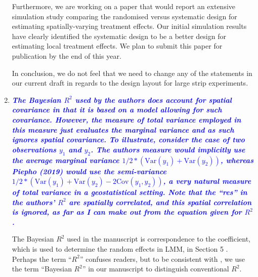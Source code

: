 \documentclass[a4paper]{article}   	%
\newcommand{\Var}{\mathrm{Var}}
\newcommand{\Cov}{\mathrm{Cov}}
\newcommand{\qtitle}[1]{\textit{\textbf{#1}}}
\begin{document}
\begin{enumerate}
    Furthermore, we are working on a paper that would report an extensive simulation study comparing the randomised versus systematic design for estimating spatially-varying treatment effects. Our initial simulation results have clearly identified the systematic design to be a better design for estimating local treatment effects. We plan to submit this paper for publication by the end of this year.
    
    In conclusion, we do not feel that we need to change any of the statements in our current draft in regards to the design layout for large strip experiments.
    
    
    
    \item \qtitle{\textcolor{blue}{The Bayesian $R^2$ used by the authors does account for spatial covariance in that it is based on a model allowing for such covariance. However, the measure of total variance employed in this measure just evaluates the marginal variance and as such ignores spatial covariance. To illustrate, consider the case of two observations $y_1$ and $y_2$. The authors measure would implicitly use the average marginal variance $1/2 * (\Var(y_1) + \Var(y_2))$, whereas Piepho (2019) would use the semi-variance $1/2 * (\Var(y_1) + \Var(y_2) - 2 \Cov(y_1, y_2))$, a very natural measure of total variance in a geostatistical setting. Note that the ``res'' in the authors' $R^2$ are spatially correlated, and this spatial correlation is ignored, as far as I can make out from the equation given for $R^2$.}}
    
    The Bayesian $R^2$ used in the manuscript is correspondence to the coefficient, which is used to determine the random effects in LMM, in Section 5 \parencite{Piepho2019Coefficient}. Perhaps the term ``$R^2$'' confuses readers, but to be consistent with \cite{Gelman2019Rsquared, Selle2019Flexible}, we use the term ``Bayesian $R^2$'' in our manuscript to distinguish conventional $R^2$.  
    

\end{enumerate}
\end{document}
